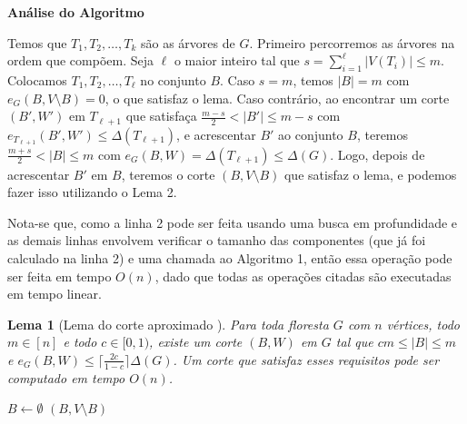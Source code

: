 \documentclass[a4paper,12pt]{article}
\newtheorem{lem}{Lema}
\begin{document}
\bigskip
\bigskip

\textbf{Análise do Algoritmo}

	Temos que $T_1, T_2, \ldots,T_k $ são 
	as árvores de $G$. 
	Primeiro percorremos as árvores na ordem que compõem. 
	Seja $\ell$ o maior inteiro tal que 
	$s = \displaystyle\sum_{i=1}^{\ell}|V(T_i)| \le m$.
	Colocamos $T_1,T_2, \ldots,T_\ell$ no conjunto $B$.
	Caso $s=m$, temos $|B|=m$ com  $e_G(B,V\setminus B)=0$, o que satisfaz o lema.
	Caso contrário, ao encontrar um corte $(B',W')$ em $T_{\ell+1}$ que
	satisfaça $\frac{m-s}{2}<|B'|\le m-s$ com $e_{T_{\ell+1}}(B',W') \le 
	\Delta(T_{\ell+1})$, e acrescentar $B'$ ao conjunto
	$B$, teremos
	$\frac{m+s}{2}<|B| \le m$ com 
	$e_G(B,W) = \Delta(T_{\ell+1}) \le \Delta(G)$.
	Logo, depois de acrescentar $B'$ em $B$, teremos o corte $(B,V\setminus B)$
	que satisfaz o lema, e podemos fazer isso utilizando o Lema 2.
	
	Nota-se que, como a linha 2 pode ser feita usando uma
	busca em profundidade e as demais 
	linhas envolvem verificar o tamanho das componentes 
	(que já foi calculado na linha 2) e uma chamada ao
	Algoritmo 1, então essa operação pode 
	ser feita em tempo $O(n)$, dado que todas as operações
	citadas são executadas em tempo linear. 

\bigskip
\bigskip
\bigskip
\bigskip
\bigskip
\bigskip
\bigskip
\bigskip


\begin{lem}[Lema do corte aproximado {\cite[Lemma 3]{Schmidt15}}]

	Para toda floresta $G$ com $n$ vértices, todo $m \in [n]$
	e todo $c \in [0,1)$,
	existe um corte $(B,W)$ em $G$ tal que 
	$cm \le |B| \le m$ e
	$e_G(B,W) \le \lceil \frac{2c}{1-c}\rceil \Delta(G)$.
	Um corte que satisfaz esses requisitos pode ser computado em
	tempo $O(n)$.
\end{lem}

\medskip
\medskip

\begin{algorithm}[H]

	\caption{Computa corte aproximado em uma floresta}
	{
		$B \gets \emptyset$\;
	}
	\Return $(B,V\setminus B)$

\end{algorithm}	
\end{document}
